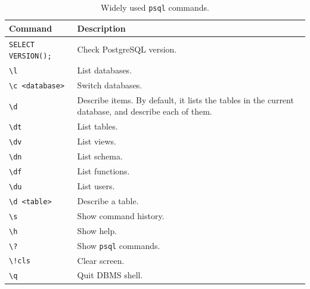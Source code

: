 \begin{table}[!htb]
	\centering \caption{Widely used \texttt{psql} commands.}\label{ch:db:tab:psqlcommands}
	\begin{tabularx}{\textwidth}{lX}
		\hline
		Command & Description \\ \hline
		\verb|SELECT VERSION();| & Check PostgreSQL version. \\ 
		\verb|\l| & List databases. \\ 
		\verb|\c <database>| & Switch databases. \\ 
		\verb|\d| & Describe items. By default, it lists the tables in the current database, and describe each of them. \\ 
		\verb|\dt| & List tables. \\ 
		\verb|\dv| & List views. \\ 
		\verb|\dn| & List schema. \\ 
		\verb|\df| & List functions. \\ 
		\verb|\du| & List users. \\ 
		\verb|\d <table>| & Describe a table. \\ 
		\verb|\s| & Show command history. \\ 
		\verb|\h| & Show help. \\ 
		\verb|\?| & Show \texttt{psql} commands. \\ 
		\verb|\!cls| & Clear screen. \\ 
		\verb|\q| & Quit DBMS shell. \\
		\hline
	\end{tabularx}
\end{table}
